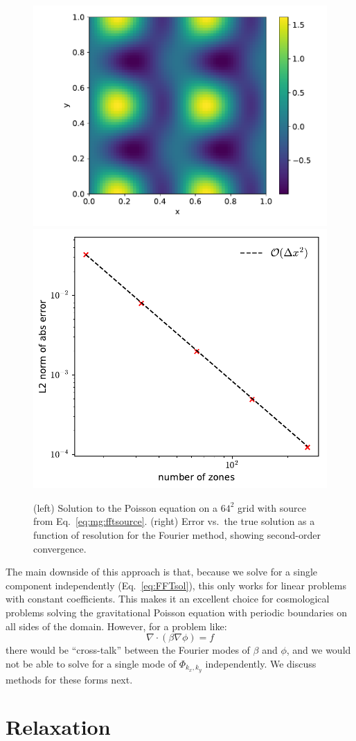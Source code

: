 \begin{figure}[t]
\centering
\includegraphics[width=0.53\linewidth]{poisson_fft}
\includegraphics[width=0.44\linewidth]{fft-poisson-converge}
\caption[FFT solution to the Poisson
  equation]{\label{fig:mg:fftpoisson} (left) Solution to the Poisson
  equation on a $64^2$ grid with source from
  Eq.~\ref{eq:mg:fftsource}. (right) Error vs.\ the true solution as a
  function of resolution for the Fourier method, showing second-order
  convergence.
  }
\end{figure}


The main downside of this approach is that, because we solve for a
single component independently (Eq.~\ref{eq:FFTsol}), this only
works for linear problems with constant coefficients.  This makes
it an excellent choice for cosmological problems solving the gravitational
Poisson equation with periodic boundaries on all sides of the domain.
However, for a problem
like:
\begin{equation}
  \nabla \cdot (\beta \nabla \phi) = f
\end{equation}
there would be ``cross-talk'' between the Fourier modes of $\beta$
and $\phi$, and we would not be able to solve for a single mode
of $\Phi_{k_x,k_y}$ independently.  We discuss methods for these
forms next.


\section{Relaxation}

